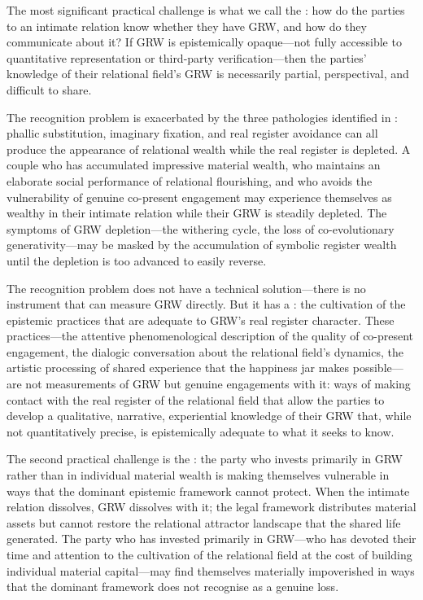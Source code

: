 The most significant practical challenge is what we call the : how do the parties to an intimate relation know whether they have GRW, and how do they communicate about it? If GRW is epistemically opaque---not fully accessible to quantitative representation or third-party verification---then the parties' knowledge of their relational field's GRW is necessarily partial, perspectival, and difficult to share.

The recognition problem is exacerbated by the three pathologies identified in : phallic substitution, imaginary fixation, and real register avoidance can all produce the appearance of relational wealth while the real register is depleted. A couple who has accumulated impressive material wealth, who maintains an elaborate social performance of relational flourishing, and who avoids the vulnerability of genuine co-present engagement may experience themselves as wealthy in their intimate relation while their GRW is steadily depleted. The symptoms of GRW depletion---the withering cycle, the loss of co-evolutionary generativity---may be masked by the accumulation of symbolic register wealth until the depletion is too advanced to easily reverse.

The recognition problem does not have a technical solution---there is no instrument that can measure GRW directly. But it has a : the cultivation of the epistemic practices that are adequate to GRW's real register character. These practices---the attentive phenomenological description of the quality of co-present engagement, the dialogic conversation about the relational field's dynamics, the artistic processing of shared experience that the happiness jar makes possible---are not measurements of GRW but genuine engagements with it: ways of making contact with the real register of the relational field that allow the parties to develop a qualitative, narrative, experiential knowledge of their GRW that, while not quantitatively precise, is epistemically adequate to what it seeks to know.

The second practical challenge is the : the party who invests primarily in GRW rather than in individual material wealth is making themselves vulnerable in ways that the dominant epistemic framework cannot protect. When the intimate relation dissolves, GRW dissolves with it; the legal framework distributes material assets but cannot restore the relational attractor landscape that the shared life generated. The party who has invested primarily in GRW---who has devoted their time and attention to the cultivation of the relational field at the cost of building individual material capital---may find themselves materially impoverished in ways that the dominant framework does not recognise as a genuine loss.

